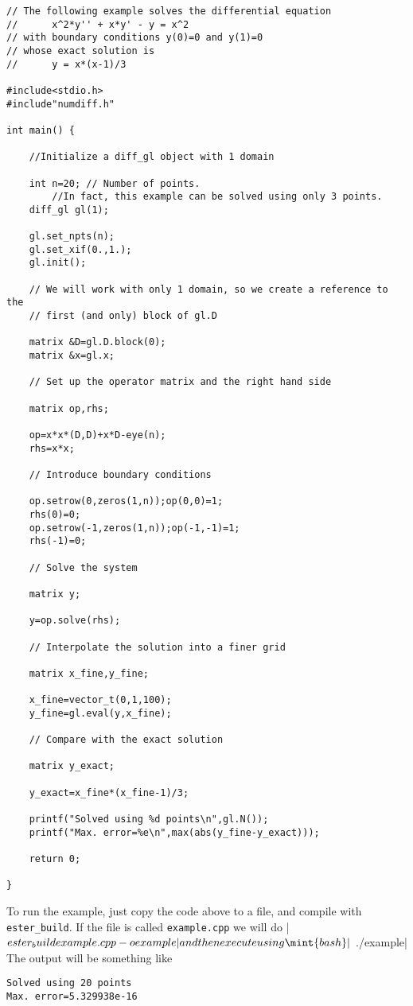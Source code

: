 \begin{verbatim}
// The following example solves the differential equation
//		x^2*y'' + x*y' - y = x^2
// with boundary conditions y(0)=0 and y(1)=0
// whose exact solution is
//      y = x*(x-1)/3		

#include<stdio.h>
#include"numdiff.h"

int main() {
	
	//Initialize a diff_gl object with 1 domain 

	int n=20; // Number of points. 
		//In fact, this example can be solved using only 3 points.
	diff_gl gl(1);
	
	gl.set_npts(n);
	gl.set_xif(0.,1.);
	gl.init();
	
	// We will work with only 1 domain, so we create a reference to the 
	// first (and only) block of gl.D
	
	matrix &D=gl.D.block(0);
	matrix &x=gl.x;
	
	// Set up the operator matrix and the right hand side
	
	matrix op,rhs;
	
	op=x*x*(D,D)+x*D-eye(n);
	rhs=x*x;
	
	// Introduce boundary conditions
	
	op.setrow(0,zeros(1,n));op(0,0)=1;
	rhs(0)=0;
	op.setrow(-1,zeros(1,n));op(-1,-1)=1;
	rhs(-1)=0;
	
	// Solve the system
	
	matrix y;
	
	y=op.solve(rhs);
	
	// Interpolate the solution into a finer grid
	
	matrix x_fine,y_fine;
	
	x_fine=vector_t(0,1,100);
	y_fine=gl.eval(y,x_fine);
	
	// Compare with the exact solution
	
	matrix y_exact;
	
	y_exact=x_fine*(x_fine-1)/3;
	
	printf("Solved using %d points\n",gl.N());
	printf("Max. error=%e\n",max(abs(y_fine-y_exact)));
	
	return 0;	
	
}
\end{verbatim}

To run the example, just copy the code above to a file, and compile with \texttt{ester\_build}. 
If the file is called \texttt{example.cpp} we will do
|$ ester_build example.cpp -o example|     %
and then execute using
\mint{bash}|$ ./example|     %
The output will be something like
\begin{verbatim}
Solved using 20 points
Max. error=5.329938e-16
\end{verbatim}


